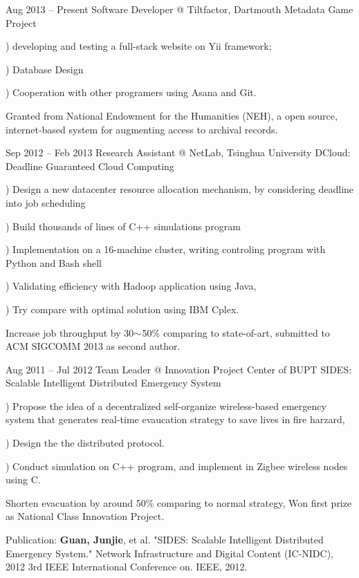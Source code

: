 \documentclass{tccv}
\begin{document}
\begin{eventlist}

\item{Aug 2013 -- Present}
     {Software Developer @ Tiltfactor, Dartmouth}
     {Metadata Game Project}
     
     ) developing and testing a full-stack website on Yii framework; 
     
     ) Database Design 
     
     ) Cooperation with other programers using Asana and Git.
     
     Granted from National Endowment for the Humanities (NEH), a open source, internet‐based system for augmenting access to archival records.
     
     
\item{Sep 2012 -- Feb 2013}
     {Research Assistant @ NetLab, Tsinghua University}
     {DCloud: Deadline Guaranteed Cloud Computing}
     
     ) Design a new datacenter resource allocation mechanism, by considering deadline into job scheduling
     
     ) Build thousands of lines of C++ simulations program
     
     ) Implementation on a 16-machine cluster, writing controling  program with Python and Bash shell
     
     ) Validating efficiency with Hadoop application using Java, 
     
     ) Try compare with optimal solution using IBM Cplex.

     Increase job throughput by 30$\scriptsize{\sim}$50\% comparing to state-of-art, submitted to ACM SIGCOMM 2013 as second author.
     
\item{Aug 2011 -- Jul 2012}
     {Team Leader @ Innovation Project Center of BUPT}
     {SIDES: Scalable Intelligent Distributed Emergency System}
     
     ) Propose the idea of a decentralized self-organize wireless-based emergency system that generates real-time evaucation strategy to save lives in fire harzard, 
     
     ) Design the the distributed protocol.
     
     ) Conduct simulation on C++ program, and implement in Zigbee wireless nodes using C.
     
Shorten evacuation by around 50\% comparing to normal strategy, Won first prize as National Class Innovation Project.

Publication: \textbf{Guan, Junjie}, et al. "SIDES: Scalable Intelligent Distributed Emergency System." Network Infrastructure and Digital Content (IC-NIDC), 2012 3rd IEEE International Conference on. IEEE, 2012.     
     
\end{eventlist}
\end{document}
